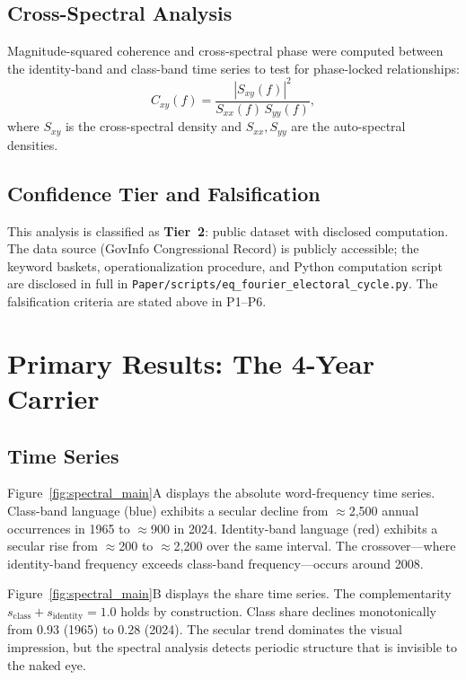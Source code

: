 \subsection{Cross-Spectral Analysis}

Magnitude-squared coherence and cross-spectral phase were computed between the identity-band and class-band time series to test for phase-locked relationships:
\begin{equation}\label{eq:21.6-coherence}
C_{xy}(f) = \frac{|S_{xy}(f)|^2}{S_{xx}(f) \, S_{yy}(f)},
\end{equation}
where $S_{xy}$ is the cross-spectral density and $S_{xx}, S_{yy}$ are the auto-spectral densities.

\subsection{Confidence Tier and Falsification}

This analysis is classified as \textbf{Tier~2}: public dataset with disclosed computation. The data source (GovInfo Congressional Record) is publicly accessible; the keyword baskets, operationalization procedure, and Python computation script are disclosed in full in \texttt{Paper/scripts/eq\_fourier\_electoral\_cycle.py}. The falsification criteria are stated above in P1--P6.

\section{Primary Results: The 4-Year Carrier}

\subsection{Time Series}

Figure~\ref{fig:spectral_main}A displays the absolute word-frequency time series. Class-band language (blue) exhibits a secular decline from $\approx$2,500 annual occurrences in 1965 to $\approx$900 in 2024. Identity-band language (red) exhibits a secular rise from $\approx$200 to $\approx$2,200 over the same interval. The crossover---where identity-band frequency exceeds class-band frequency---occurs around 2008.

Figure~\ref{fig:spectral_main}B displays the share time series. The complementarity $s_{\text{class}} + s_{\text{identity}} = 1.0$ holds by construction. Class share declines monotonically from 0.93 (1965) to 0.28 (2024). The secular trend dominates the visual impression, but the spectral analysis detects periodic structure that is invisible to the naked eye.

